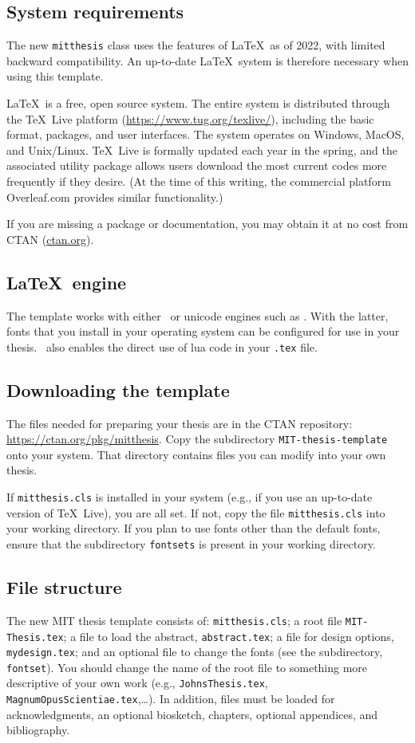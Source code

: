 \documentclass[11pt]{article}
\newcommand*\pdfTeX{\hologo{pdfTeX}}
\begin{document}
\subsection*{System requirements}
The new \texttt{mitthesis} class uses the features of \LaTeX\ as of 2022, with limited backward compatibility. An up-to-date \LaTeX\ system is therefore necessary when using this template.  

\LaTeX\ is a free, open source system. The entire system is distributed through the \TeX\ Live platform (\url{https://www.tug.org/texlive/}), including the basic format, packages, and user interfaces.  The system operates on Windows, MacOS, and Unix/Linux. \TeX\ Live is formally updated each year in the spring, and the associated utility package allows users download the most current codes more frequently if they desire. (At the time of this writing, the commercial platform Overleaf.com provides similar functionality.)

If you are missing a package or documentation, you may obtain it at no cost from CTAN (\href{http://ctan.org}{ctan.org}). 

\subsection*{\LaTeX\ engine}
The template works with either \pdfTeX\ or unicode engines such as \LuaLaTeX.  With the latter, fonts that you install in your operating system can be configured for use in your thesis. \LuaLaTeX\ also enables the direct use of lua code in your \texttt{.tex} file.

\subsection*{Downloading the template}
The files needed for preparing your thesis are in the CTAN repository: \url{https://ctan.org/pkg/mitthesis}. Copy the subdirectory \texttt{MIT-thesis-template} onto your system. That directory contains files you can modify into your own thesis. 

If \texttt{mitthesis.cls} is installed in your system (e.g., if you use an up-to-date version of \TeX\ Live), you are all set.  If not, copy the file \texttt{mitthesis.cls} into your working directory. If you plan to use fonts other than the default fonts, ensure that the subdirectory \texttt{fontsets} is present in your working directory.

\subsection*{File structure}
The new MIT thesis template consists of: \texttt{mitthesis.cls}; a root file \texttt{MIT-Thesis.tex}; a file to load the abstract, \texttt{abstract.tex}; a file for design options, \texttt{mydesign.tex}; and an optional file to change the fonts (see the subdirectory, \texttt{fontset}). You should change the name of the root file to something more descriptive of your own work (e.g., \texttt{JohnsThesis.tex}, \texttt{MagnumOpusScientiae.tex},\ldots). In addition, files must be loaded for acknowledgments, an optional biosketch, chapters, optional appendices, and bibliography.
\end{document}
